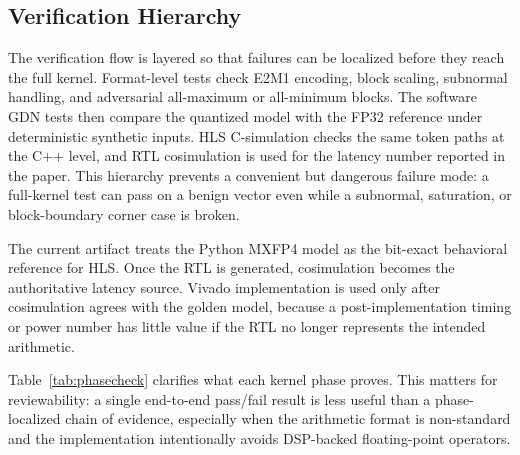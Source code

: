 \documentclass[conference]{IEEEtran}
\begin{document}
\subsection{Verification Hierarchy}

The verification flow is layered so that failures can be localized before they
reach the full kernel. Format-level tests check E2M1 encoding, block scaling,
subnormal handling, and adversarial all-maximum or all-minimum blocks. The
software GDN tests then compare the quantized model with the FP32 reference under
deterministic synthetic inputs. HLS C-simulation checks the same token paths at
the C++ level, and RTL cosimulation is used for the latency number reported in
the paper. This hierarchy prevents a convenient but dangerous failure mode: a
full-kernel test can pass on a benign vector even while a subnormal, saturation,
or block-boundary corner case is broken.

The current artifact treats the Python MXFP4 model as the bit-exact behavioral
reference for HLS. Once the RTL is generated, cosimulation becomes the
authoritative latency source. Vivado implementation is used only after
cosimulation agrees with the golden model, because a post-implementation timing
or power number has little value if the RTL no longer represents the intended
arithmetic.

\begin{table}[t]
  \centering
  \caption{Kernel phases and verification anchors. The table is qualitative;
  measured values remain in generated result tables.}
  \label{tab:phasecheck}
\end{table}

Table~\ref{tab:phasecheck} clarifies what each kernel phase proves. This matters
for reviewability: a single end-to-end pass/fail result is less useful than a
phase-localized chain of evidence, especially when the arithmetic format is
non-standard and the implementation intentionally avoids DSP-backed
floating-point operators.
\end{document}
